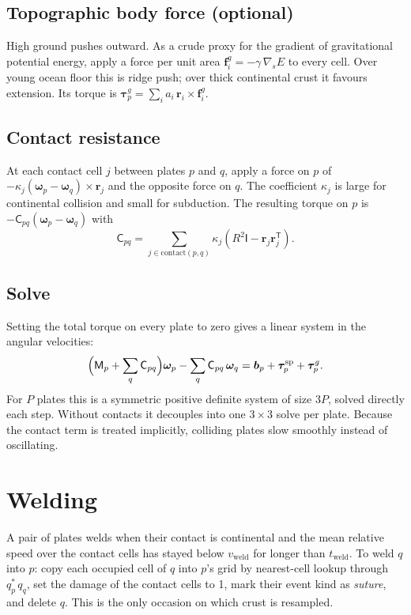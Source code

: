 \documentclass[11pt,a4paper]{article}
\newcommand{\vect}[1]{\bm{#1}}
\newcommand{\rr}{\vect{r}}
\newcommand{\om}{\vect{\omega}}
\newcommand{\gs}{\nabla_{\!s}}
\begin{document}
\subsection{Topographic body force (optional)}

High ground pushes outward. As a crude proxy for the gradient of
gravitational potential energy, apply a force per unit area
$\vect{f}^g_i = -\gamma\,\gs E$ to every cell. Over young ocean floor this is
ridge push; over thick continental crust it favours extension. Its torque is
$\vect{\tau}^{g}_p = \sum_i a_i\,\rr_i \times \vect{f}^g_i$.

\subsection{Contact resistance}

At each contact cell $j$ between plates $p$ and $q$, apply a force on $p$ of
$-\kappa_j(\om_p - \om_q) \times \rr_j$ and the opposite force on $q$. The
coefficient $\kappa_j$ is large for continental collision and small for
subduction. The resulting torque on $p$ is
$-\mathsf{C}_{pq}(\om_p - \om_q)$ with
\begin{equation}
\mathsf{C}_{pq} = \sum_{j \in \mathrm{contact}(p,q)} \kappa_j
\left(R^2 \mathsf{I} - \rr_j \rr_j^{\mathsf T}\right).
\end{equation}

\subsection{Solve}

Setting the total torque on every plate to zero gives a linear system in the
angular velocities:
\begin{equation}
\Bigl(\mathsf{M}_p + \sum_{q} \mathsf{C}_{pq}\Bigr)\om_p
 - \sum_{q} \mathsf{C}_{pq}\,\om_q
 = \vect{b}_p + \vect{\tau}^\mathrm{sp}_p + \vect{\tau}^{g}_p .
\label{eq:solve}
\end{equation}
For $P$ plates this is a symmetric positive definite system of size $3P$,
solved directly each step. Without contacts it decouples into one
$3\times 3$ solve per plate. Because the contact term is treated implicitly,
colliding plates slow smoothly instead of oscillating.

\section{Welding}\label{sec:weld}

A pair of plates welds when their contact is continental and the mean
relative speed over the contact cells has stayed below $v_\mathrm{weld}$ for
longer than $t_\mathrm{weld}$. To weld $q$ into $p$: copy each occupied cell
of $q$ into $p$'s grid by nearest-cell lookup through
$q_p^{*}\,q_q$, set the damage of the contact cells to 1, mark their event
kind as \emph{suture}, and delete $q$. This is the only occasion on which
crust is resampled.
\end{document}
